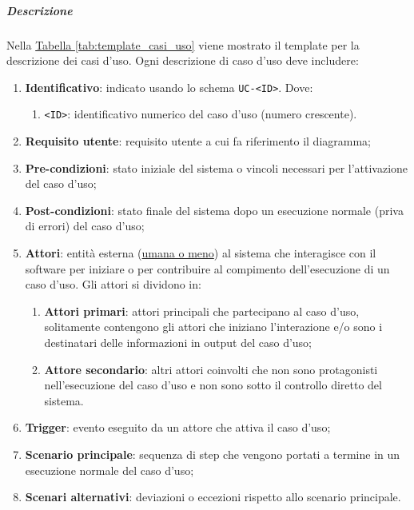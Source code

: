 \subparagraph{Descrizione}
Nella \hyperref[tab:template_casi_uso]{Tabella \ref{tab:template_casi_uso}} viene mostrato il template per la descrizione dei casi d'uso.
Ogni descrizione di caso d'uso deve includere:
\begin{enumerate}
    \item \textbf{Identificativo}: indicato usando lo schema \texttt{UC-<ID>}.
    Dove:
    \begin{enumerate}
        \item \texttt{<ID>}: identificativo numerico del caso d'uso (numero crescente).
    \end{enumerate}

    \item \textbf{Requisito utente}: requisito utente a cui fa riferimento il diagramma;

    \item \textbf{Pre-condizioni}: stato iniziale del sistema o vincoli necessari per l'attivazione del caso d'uso;

    \item \textbf{Post-condizioni}: stato finale del sistema dopo un esecuzione normale (priva di errori) del caso d'uso;

    \item \textbf{Attori}: entità esterna (\underline{umana o meno}) al sistema che interagisce con il software per iniziare o per contribuire al compimento dell'esecuzione di un caso d'uso.  
    Gli attori si dividono in:
    \begin{enumerate}
        \item  \textbf{Attori primari}: attori principali che partecipano al caso d'uso, solitamente contengono gli attori che iniziano l'interazione e/o sono i destinatari delle informazioni in output del caso d'uso;
        \item \textbf{Attore secondario}: altri attori coinvolti che non sono protagonisti nell'esecuzione del caso d'uso e non sono sotto il controllo diretto del sistema.
    \end{enumerate}

    \item \textbf{Trigger}: evento eseguito da un attore che attiva il caso d'uso;

    \item \textbf{Scenario principale}: sequenza di step che vengono portati a termine in un esecuzione normale del caso d'uso;
    
    \item \textbf{Scenari alternativi}: deviazioni o eccezioni rispetto allo scenario principale.
\end{enumerate}

